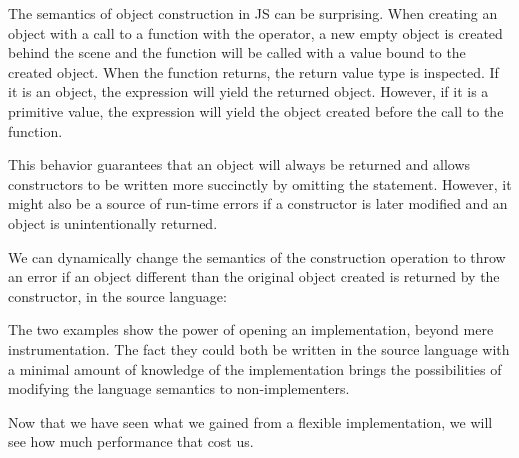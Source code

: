 The semantics of object construction in JS can be surprising. When creating an
object with a call to a function with the  operator, a new empty object
is created behind the scene and the function will be called with a 
value bound to the created object. When the function returns, the return value type 
is inspected. If it is an object, the  expression will yield the
returned object. However, if it is a primitive value, the  expression
will yield the object created before the call to the function.

This behavior guarantees that an object will always be returned and allows
constructors to be written more succinctly by omitting the 
statement. However, it might also be a source of run-time errors if a
constructor is later modified and an object is unintentionally returned.

We can dynamically change the semantics of the construction operation to throw
an error if an object different than the original object created is returned by
the constructor, in the source language:


The two examples show the power of opening an implementation, beyond mere
instrumentation. The fact they could both be written in the source language
with a minimal amount of knowledge of the implementation brings the
possibilities of modifying the language semantics to non-implementers.

Now that we have seen what we gained from a flexible implementation, we will
see how much performance that cost us.
